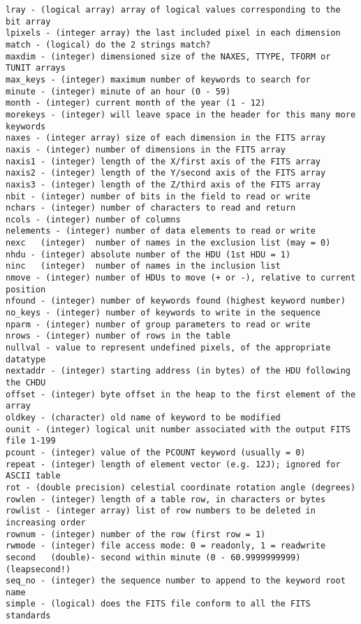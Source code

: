 \documentclass[11pt]{book}
\begin{document}
\begin{verbatim}
lray - (logical array) array of logical values corresponding to the bit array
lpixels - (integer array) the last included pixel in each dimension
match - (logical) do the 2 strings match?
maxdim - (integer) dimensioned size of the NAXES, TTYPE, TFORM or TUNIT arrays
max_keys - (integer) maximum number of keywords to search for
minute - (integer) minute of an hour (0 - 59)
month - (integer) current month of the year (1 - 12)
morekeys - (integer) will leave space in the header for this many more keywords
naxes - (integer array) size of each dimension in the FITS array
naxis - (integer) number of dimensions in the FITS array
naxis1 - (integer) length of the X/first axis of the FITS array
naxis2 - (integer) length of the Y/second axis of the FITS array
naxis3 - (integer) length of the Z/third axis of the FITS array
nbit - (integer) number of bits in the field to read or write
nchars - (integer) number of characters to read and return
ncols - (integer) number of columns
nelements - (integer) number of data elements to read or write
nexc   (integer)  number of names in the exclusion list (may = 0)
nhdu - (integer) absolute number of the HDU (1st HDU = 1)
ninc   (integer)  number of names in the inclusion list
nmove - (integer) number of HDUs to move (+ or -), relative to current position
nfound - (integer) number of keywords found (highest keyword number)
no_keys - (integer) number of keywords to write in the sequence
nparm - (integer) number of group parameters to read or write
nrows - (integer) number of rows in the table
nullval - value to represent undefined pixels, of the appropriate datatype
nextaddr - (integer) starting address (in bytes) of the HDU following the CHDU
offset - (integer) byte offset in the heap to the first element of the array
oldkey - (character) old name of keyword to be modified
ounit - (integer) logical unit number associated with the output FITS file 1-199
pcount - (integer) value of the PCOUNT keyword (usually = 0)
repeat - (integer) length of element vector (e.g. 12J); ignored for ASCII table
rot - (double precision) celestial coordinate rotation angle (degrees)
rowlen - (integer) length of a table row, in characters or bytes
rowlist - (integer array) list of row numbers to be deleted in increasing order
rownum - (integer) number of the row (first row = 1)
rwmode - (integer) file access mode: 0 = readonly, 1 = readwrite
second   (double)- second within minute (0 - 60.9999999999) (leapsecond!)
seq_no - (integer) the sequence number to append to the keyword root name
simple - (logical) does the FITS file conform to all the FITS standards

\end{verbatim}
\end{document}
